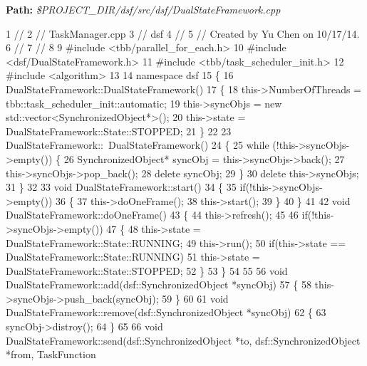 {\bfseries Path\+:} {\itshape \$\+P\+R\+O\+J\+E\+C\+T\+\_\+\+D\+I\+R/dsf/src/dsf/\+Dual\+State\+Framework.cpp} 
\begin{DoxyCodeInclude}
1 \textcolor{comment}{//}
2 \textcolor{comment}{//  TaskManager.cpp}
3 \textcolor{comment}{//  dsf}
4 \textcolor{comment}{//}
5 \textcolor{comment}{//  Created by Yu Chen on 10/17/14.}
6 \textcolor{comment}{//}
7 \textcolor{comment}{//}
8 
9 \textcolor{preprocessor}{#include <tbb/parallel\_for\_each.h>}
10 \textcolor{preprocessor}{#include <dsf/DualStateFramework.h>}
11 \textcolor{preprocessor}{#include <tbb/task\_scheduler\_init.h>}
12 \textcolor{preprocessor}{#include <algorithm>}
13 
14 \textcolor{keyword}{namespace }dsf
15 \{
16     DualStateFramework::DualStateFramework()
17     \{
18         this->NumberOfThreads = tbb::task\_scheduler\_init::automatic;
19         this->syncObjs = \textcolor{keyword}{new} std::vector<SynchronizedObject*>();
20         this->state = DualStateFramework::State::STOPPED;
21     \}
22     
23     DualStateFramework::~DualStateFramework()
24     \{
25         \textcolor{keywordflow}{while} (!this->syncObjs->empty()) \{
26             SynchronizedObject* syncObj = this->syncObjs->back();
27             this->syncObjs->pop\_back();
28             \textcolor{keyword}{delete} syncObj;
29         \}
30         \textcolor{keyword}{delete} this->syncObjs;
31     \}
32     
33     \textcolor{keywordtype}{void} DualStateFramework::start()
34     \{
35         \textcolor{keywordflow}{if}(!this->syncObjs->empty())
36         \{
37             this->doOneFrame();
38             this->start();
39         \}
40     \}
41     
42     \textcolor{keywordtype}{void} DualStateFramework::doOneFrame()
43     \{
44         this->refresh();
45         
46         \textcolor{keywordflow}{if}(!this->syncObjs->empty())
47         \{
48             this->state = DualStateFramework::State::RUNNING;
49             this->run();
50             \textcolor{keywordflow}{if}(this->state == DualStateFramework::State::RUNNING)
51                 this->state = DualStateFramework::State::STOPPED;
52         \}
53     \}
54     
55     
56     \textcolor{keywordtype}{void} DualStateFramework::add(dsf::SynchronizedObject *syncObj)
57     \{
58         this->syncObjs->push\_back(syncObj);
59     \}
60     
61     \textcolor{keywordtype}{void} DualStateFramework::remove(dsf::SynchronizedObject *syncObj)
62     \{
63         syncObj->distroy();
64     \}
65     
66     \textcolor{keywordtype}{void} DualStateFramework::send(dsf::SynchronizedObject *to, dsf::SynchronizedObject *from, TaskFunction 

\end{DoxyCodeInclude}

